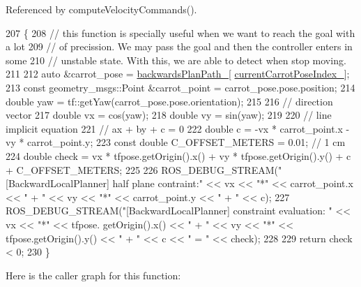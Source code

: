 Referenced by compute\+Velocity\+Commands().


\begin{DoxyCode}
207         \{
208             \textcolor{comment}{// this function is specially useful when we want to reach the goal with a lot}
209             \textcolor{comment}{// of precission. We may pass the goal and then the controller enters in some}
210             \textcolor{comment}{// unstable state. With this, we are able to detect when stop moving.}
211 
212             \textcolor{keyword}{auto} &carrot\_pose = \hyperlink{classcl__move__base__z_1_1backward__local__planner_1_1BackwardLocalPlanner_ad9cde5c85f782cab2ddb4030e3c3f2cf}{backwardsPlanPath\_}[
      \hyperlink{classcl__move__base__z_1_1backward__local__planner_1_1BackwardLocalPlanner_a2e8f2b78bc97f27c5fa431f3af2261ed}{currentCarrotPoseIndex\_}];
213             \textcolor{keyword}{const} geometry\_msgs::Point &carrot\_point = carrot\_pose.pose.position;
214             \textcolor{keywordtype}{double} yaw = tf::getYaw(carrot\_pose.pose.orientation);
215 
216             \textcolor{comment}{// direction vector}
217             \textcolor{keywordtype}{double} vx = cos(yaw);
218             \textcolor{keywordtype}{double} vy = sin(yaw);
219 
220             \textcolor{comment}{// line implicit equation}
221             \textcolor{comment}{// ax + by + c = 0}
222             \textcolor{keywordtype}{double} c = -vx * carrot\_point.x - vy * carrot\_point.y;
223             \textcolor{keyword}{const} \textcolor{keywordtype}{double} C\_OFFSET\_METERS = 0.01; \textcolor{comment}{// 1 cm}
224             \textcolor{keywordtype}{double} check = vx * tfpose.getOrigin().x() + vy * tfpose.getOrigin().y() + c + C\_OFFSET\_METERS;
225 
226             ROS\_DEBUG\_STREAM(\textcolor{stringliteral}{"[BackwardLocalPlanner] half plane contraint:"} << vx << \textcolor{stringliteral}{"*"} << carrot\_point.x 
      << \textcolor{stringliteral}{" + "} << vy << \textcolor{stringliteral}{"*"} << carrot\_point.y << \textcolor{stringliteral}{" + "} << c);
227             ROS\_DEBUG\_STREAM(\textcolor{stringliteral}{"[BackwardLocalPlanner] constraint evaluation: "} << vx << \textcolor{stringliteral}{"*"} << tfpose.
      getOrigin().x() << \textcolor{stringliteral}{" + "} << vy << \textcolor{stringliteral}{"*"} << tfpose.getOrigin().y() << \textcolor{stringliteral}{" + "} << c << \textcolor{stringliteral}{" = "} << check);
228 
229             \textcolor{keywordflow}{return} check < 0;
230         \}
\end{DoxyCode}
Here is the caller graph for this function\+:
